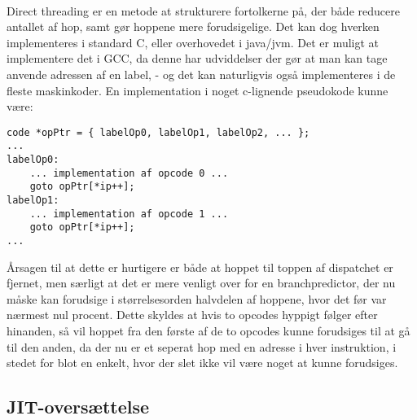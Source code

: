 \documentclass[12pt]{article}
\begin{document}
\paragraph{}
Direct threading er en metode at strukturere fortolkerne på, der både reducere antallet af hop, samt gør hoppene mere forudsigelige. Det kan dog hverken implementeres i standard C, eller overhovedet i java/jvm. Det er muligt at implementere det i GCC, da denne har udviddelser der gør at man kan tage anvende adressen af en label, - og det kan naturligvis også implementeres i de fleste maskinkoder. En implementation i noget c-lignende pseudokode kunne være:
\begin{verbatim}
code *opPtr = { labelOp0, labelOp1, labelOp2, ... };
...
labelOp0:
    ... implementation af opcode 0 ...
    goto opPtr[*ip++];
labelOp1:
    ... implementation af opcode 1 ...
    goto opPtr[*ip++];
...
\end{verbatim}
Årsagen til at dette er hurtigere er både at hoppet til toppen af dispatchet er fjernet,
men særligt at det er mere venligt over for en branchpredictor, der nu måske kan forudsige i størrelsesorden halvdelen af hoppene, hvor det før var nærmest nul procent. Dette skyldes at hvis to opcodes hyppigt følger efter hinanden, så vil hoppet fra den første af de to opcodes kunne forudsiges til at gå til den anden, da der nu er et seperat hop med en adresse i hver instruktion, i stedet for blot en enkelt, hvor der slet ikke vil være noget at kunne forudsiges.





\subsection{JIT-oversættelse}





%
%
%
%
%
%


\newpage
{}



\appendix

\newpage
{}
\printindex
\end{document}
